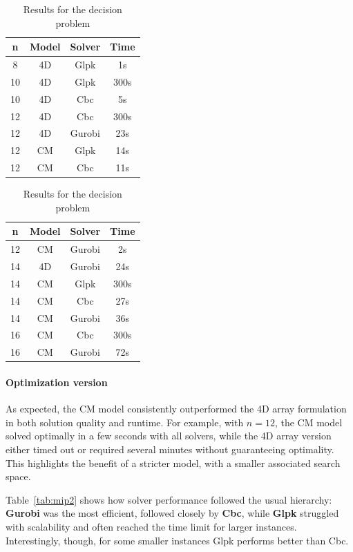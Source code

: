 \begin{table}[H]
    \centering
    \begin{tabular}{|c|c|c|c|}
    \hline
        \textbf{n} &  \textbf{Model} & \textbf{Solver} & \textbf{Time} \\
    \hline
         8 & 4D & Glpk & 1s \\
         10 & 4D & Glpk & 300s \\
         10 & 4D & Cbc & 5s \\
         12 & 4D & Cbc & 300s \\
         12 & 4D & Gurobi & 23s \\
         12 & CM & Glpk & 14s \\
         12 & CM & Cbc & 11s \\
    \hline
    \end{tabular}
    \begin{tabular}{|c|c|c|c|}
    \hline
        \textbf{n} &  \textbf{Model} & \textbf{Solver} & \textbf{Time} \\
    \hline
        12 & CM & Gurobi & 2s \\
         14 & 4D & Gurobi & 24s \\
         14 & CM & Glpk & 300s \\
         14 & CM & Cbc & 27s \\
         14 & CM & Gurobi & 36s \\
         16 & CM & Cbc & 300s \\
         16 & CM & Gurobi & 72s \\
    \hline
    \end{tabular}
    \caption{Results for the decision problem}
    \label{tab:mip1}
\end{table}

\paragraph{Optimization version}
As expected, the CM model consistently outperformed the 4D array formulation in both solution quality and runtime. 
For example, with $n=12$, the CM model solved optimally in a few seconds with all solvers, while the 4D array version either timed out or required several minutes without guaranteeing optimality.
This highlights the benefit of a stricter model, with a smaller associated search space.

Table~\ref{tab:mip2} shows how solver performance followed the usual hierarchy: \textbf{Gurobi} was the most efficient, followed closely by \textbf{Cbc}, while \textbf{Glpk} struggled with scalability and often reached the time limit for larger instances. 
Interestingly, though, for some smaller instances Glpk performs better than Cbc.

